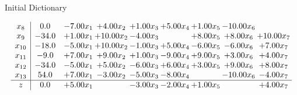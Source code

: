 \documentclass[8pt]{article}
\begin{document}
Initial Dictionary 

\[\begin{array}{c| c c@{\hskip 2pt} c@{\hskip 2pt} c@{\hskip 2pt} c@{\hskip 2pt} c@{\hskip 2pt} c@{\hskip 2pt} c@{\hskip 2pt} }
 x_{8}   &  0.0 & -7.00 x_{1} & +  4.00 x_{2} & +  1.00 x_{3} & +  5.00 x_{4} & +  1.00 x_{5} & -10.00 x_{6} &   \\
 x_{9}   &  -34.0 & +  1.00 x_{1} & + 10.00 x_{2} & -4.00 x_{3} &   & +  8.00 x_{5} & +  8.00 x_{6} & + 10.00 x_{7}\\
 x_{10}   &  -18.0 & -5.00 x_{1} & + 10.00 x_{2} & -1.00 x_{3} & +  5.00 x_{4} & -6.00 x_{5} & -6.00 x_{6} & +  7.00 x_{7}\\
 x_{11}   &  -9.0 & +  7.00 x_{1} & +  9.00 x_{2} & +  1.00 x_{3} & -9.00 x_{4} & +  9.00 x_{5} & +  3.00 x_{6} & +  4.00 x_{7}\\
 x_{12}   &  -34.0 & -5.00 x_{1} & +  5.00 x_{2} & -6.00 x_{3} & +  6.00 x_{4} & +  3.00 x_{5} & +  9.00 x_{6} & +  8.00 x_{7}\\
 x_{13}   &  54.0 & +  7.00 x_{1} & -3.00 x_{2} & -5.00 x_{3} & -8.00 x_{4} &   & -10.00 x_{6} & -4.00 x_{7}\\
\hline
z    &  0.0 & +  5.00 x_{1} &   & -3.00 x_{3} & -2.00 x_{4} & +  1.00 x_{5} &   & +  4.00 x_{7}\\
\end{array}\]
\end{document}
